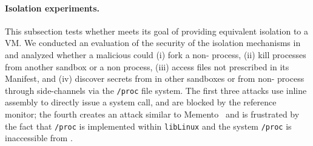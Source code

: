 \begin{comment}
In our design, only trusted applications such as system utilities can run as a non-\graphene{} \picoproc{}, as they need many more functionality that the \graphene{} Linux ABI support. From a security standpoint, nothing prevents a \graphene{} \picoprocs{} from acting maliciously, as application code runs unmodified in \graphene{}.  However, it is important to note that \graphene{}’s goal is not to secure a system but to isolate applications in a competitive level compared to the VM alternative. 
\end{comment}




\paragraph{Isolation experiments.}
This subsection tests whether \graphene{} meets its goal of providing equivalent isolation
to a VM.
We conducted an evaluation of the security of the isolation mechanisms in \graphene{} and analyzed whether a malicious \graphene{} \picoproc{} could 
(i) fork a non-\graphene{} process, 
(ii)  kill processes from another sandbox or a non \graphene{} process, 
(iii) access files not prescribed in its Manifest, and 
(iv) discover secrets from \picoprocs{} in other sandboxes or from non-\graphene{} process through side-channels via the {\tt /proc} file system. 
The first three attacks use inline assembly to directly issue a system call, and are blocked by the reference monitor; the fourth creates
an attack similar to Memento~\cite{memento} and is frustrated by the fact that {\tt /proc} is implemented within {\tt libLinux} and
the system {\tt /proc} is inaccessible from \graphene{}.

